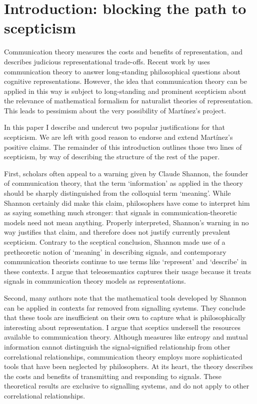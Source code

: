 \section{Introduction: blocking the path to scepticism}\label{sec:intro}

Communication theory measures the costs and benefits of representation, and describes judicious representational trade-offs. 
Recent work by \citet{martinez2019deception,martinez2019representations} uses communication theory to answer long-standing philosophical questions about cognitive representations.
However, the idea that communication theory can be applied in this way is subject to long-standing and prominent scepticism about the relevance of mathematical formalism for naturalist theories of representation.
This leads to pessimism about the very possibility of Mart\'{i}nez's project.

In this paper I describe and undercut two popular justifications for that scepticism.
We are left with good reason to endorse and extend Mart\'{i}nez's positive claims.
The remainder of this introduction outlines those two lines of scepticism, by way of describing the structure of the rest of the paper.

First, scholars often appeal to a warning given by Claude Shannon, the founder of communication theory, that the term `information' as applied in the theory should be sharply distinguished from the colloquial term `meaning'.
While Shannon certainly did make this claim, philosophers have come to interpret him as saying something much stronger: that signals in communication-theoretic models need not mean anything.
Properly interpreted, Shannon's warning in no way justifies that claim, and therefore does not justify currently prevalent scepticism.
Contrary to the sceptical conclusion, Shannon made use of a pretheoretic notion of `meaning' in describing signals, and contemporary communication theorists continue to use terms like `represent' and `describe' in these contexts.
I argue that teleosemantics captures their usage because it treats signals in communication theory models as representations.

Second, many authors note that the mathematical tools developed by Shannon can be applied in contexts far removed from signalling systems.
They conclude that these tools are insufficient on their own to capture what is philosophically interesting about representation.
I argue that sceptics undersell the resources available to communication theory.
Although measures like entropy and mutual information cannot distinguish the signal-signified relationship from other correlational relationships, communication theory employs more sophisticated tools that have been neglected by philosophers.
At its heart, the theory describes the costs and benefits of transmitting and responding to signals.
These theoretical results are exclusive to signalling systems, and do not apply to other correlational relationships.

